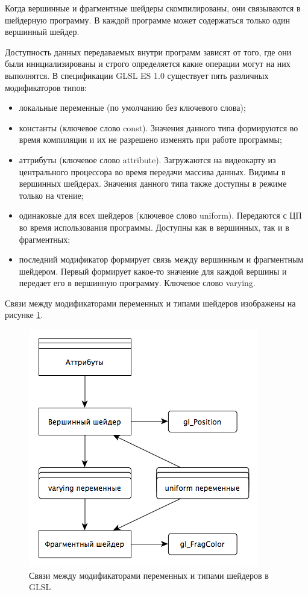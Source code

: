 Когда вершинные и фрагментные шейдеры скомпилированы, они связываются в шейдерную программу.
В каждой программе может содержаться только один вершинный шейдер.

Доступность данных передаваемых внутри программ зависят от того, где они были инициализированы
и строго определяется какие операции могут на них выполнятся. В спецификации GLSL ES 1.0 
существует пять различных модификаторов типов:

\begin{itemize}
  \item локальные переменные (по умолчанию без ключевого слова);
  \item константы (ключевое слово const). Значения данного типа формируются во время компиляции и их не
    разрешено изменять при работе программы;
  \item аттрибуты (ключевое слово attribute). Загружаются на видеокарту из центрального процессора во время передачи массива данных. Видимы в 
    вершинных шейдерах. Значения данного типа также доступны в режиме только на чтение;
  \item одинаковые для всех шейдеров (ключевое слово uniform). Передаются с ЦП во время 
    использования программы. Доступны как в вершинных, так и в фрагментных;
  \item последний модификатор формирует связь между вершинным и фрагментным шейдером. Первый
    формирует какое-то значение для каждой вершины и передает его в вершинную программу.
    Ключевое слово varying.
\end{itemize}

Связи между модификаторами переменных и типами шейдеров изображены на рисунке \ref{fig:glsl_vars}.

\begin{figure}
\begin{center}
  \includegraphics[scale=1]{Figures/glsl_vars}
\end{center}
\caption{Связи между модификаторами переменных и типами шейдеров в GLSL}
\label{fig:glsl_vars}
\end{figure}


